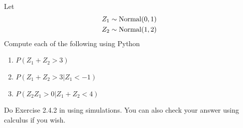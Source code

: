 




\begin{exercise} Let
\begin{align*}
Z_1 &\sim {\rm Normal}(0,1)\\
Z_2 &\sim {\rm Normal}(1,2)
\end{align*} 
Compute each of the following using Python
\begin{enumerate}[label=(\alph*)]
\item $P(Z_1 + Z_2>3)$
\item $P(Z_1 + Z_2>3|Z_1<-1)$
\item $P(Z_2Z_1>0|Z_1+Z_2<4)$
\end{enumerate}
\end{exercise}


\begin{exercise}
Do Exercise  2.4.2 in  \cite{evans} using simulations. You can also check your answer using calculus if you wish. 
\end{exercise}

